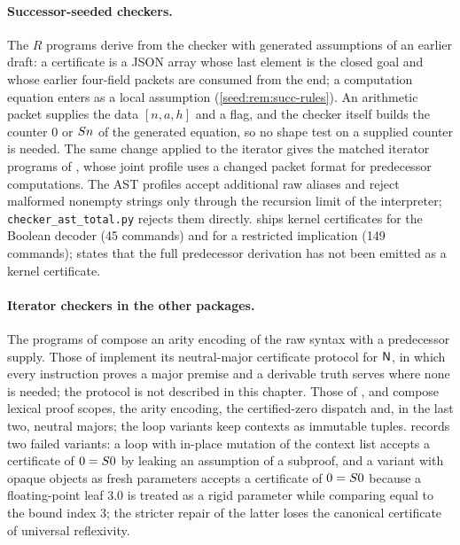 \paragraph{Successor-seeded checkers.}
The $R$ programs derive from the checker with generated assumptions of an
earlier draft: a certificate is a JSON array whose last element is the
closed goal and whose earlier four-field packets are consumed from the end;
a computation equation enters as a local assumption
(\cref{seed:rem:succ-rules}). An arithmetic packet supplies the data
$[n,a,h]$ and a flag, and the checker itself builds the counter $0$ or
$S n$ of the generated equation, so no shape test on a supplied counter
is needed. The same change applied to the iterator gives the matched
iterator programs of , whose joint profile uses a
changed packet format for predecessor computations. The AST profiles accept
additional raw aliases and reject malformed nonempty strings only through
the recursion limit of the interpreter; \texttt{checker\_ast\_total.py}
rejects them directly.  ships kernel certificates for
the Boolean decoder (45 commands) and for a restricted implication (149
commands);  states that the full
predecessor derivation has not been emitted as a kernel certificate.

\paragraph{Iterator checkers in the other packages.}
The programs of  compose an arity encoding of the
raw syntax with a predecessor supply. Those of
 implement its neutral-major certificate
protocol for $\mathsf{N}$, in which every instruction proves a major premise and a
derivable truth serves where none is needed; the protocol is not described
in this chapter. Those of
,  and
 compose lexical proof scopes, the arity
encoding, the certified-zero dispatch and, in the last two, neutral majors;
the loop variants keep contexts as immutable tuples. 
records two failed variants: a loop with in-place mutation of the context
list accepts a certificate of $0=S 0$ by leaking an assumption of a
subproof, and a variant with opaque objects as fresh parameters accepts a
certificate of $0=S 0$ because a floating-point leaf $3.0$ is treated as
a rigid parameter while comparing equal to the bound index $3$; the stricter
repair of the latter loses the canonical certificate of universal
reflexivity.

